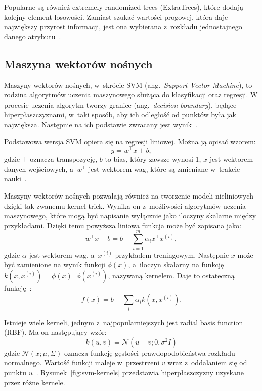 Popularne są również extremely randomized trees (ExtraTrees), które dodają kolejny element losowości.
Zamiast szukać wartości progowej, która daje największy przyrost informacji, jest ona wybierana z~rozkładu jednostajnego danego atrybutu~\cite{Russell2020}.

\subsection{Maszyna wektorów nośnych}\label{subsec:maszyna-wektorow-nosnych}

Maszyny wektorów nośnych, w~skrócie SVM (ang.~\textit{Support Vector Machine}), to rodzina algorytmów uczenia maszynowego służąca do klasyfikacji oraz regresji.
W procesie uczenia algorytm tworzy granice (ang.~\textit{decision boundary}), będące hiperpłaszczyznami, w~taki sposób, aby ich odległość od punktów była jak największa.
Następnie na ich podstawie zwracany jest wynik~\cite{Russell2020}.

Podstawowa wersja SVM opiera się na regresji liniowej.
Można ją opisać wzorem:
\[y = w^\top x + b,\]
gdzie \(\top\) oznacza transpozycję, \(b\) to bias, który zawsze wynosi 1, \(x\) jest wektorem danych wejściowych, a~\(w^\top\) jest wektorem wag, które są zmieniane w~trakcie nauki~\cite{Goodfellow2016}.

Maszyny wektorów nośnych pozwalają również na tworzenie modeli nieliniowych dzięki tak zwanemu kernel trick.
Wynika on z~możliwości algorytmów uczenia maszynowego, które mogą być napisanie wyłącznie jako iloczyny skalarne między przykładami.
Dzięki temu powyższa liniowa funkcja może być zapisana jako:
\[w^\top x + b = b + \sum_{i=1}^{m} \alpha_{i} x^\top x^{(i)},\]
gdzie \(\alpha\) jest wektorem wag, a~\(x^{(i)}\) przykładem treningowym.
Następnie \(x\) może być zamienione na wynik funkcji \(\phi(x)\), a~iloczyn skalarny na funkcję \(k(x, x^{(i)}) = \phi(x)^\top \phi(x^{(i)})\), nazywaną kernelem.
Daje to ostateczną funkcję~\cite{Goodfellow2016}:
\[f(x) = b + \sum_{i} \alpha_{i} k(x, x^{(i)}).\]

Istnieje wiele kerneli, jednym z~najpopularniejszych jest radial basis function (RBF).
Ma on następujący wzór:
\[k(u, v) = \mathcal{N}(u - v; 0,\sigma^2 I)\]
gdzie \(\mathcal{N}(x; \mu, \Sigma)\) oznacza funkcję gęstości prawdopodobieństwa rozkładu normalnego.
Wartość funkcji maleje w~przestrzeni \(v\) wraz z~oddalaniem się od punktu \(u\)~\cite{Goodfellow2016}.
Rysunek~\ref{fig:svm-kernels} przedstawia hiperpłaszczyzny uzyskane przez różne kernele.

